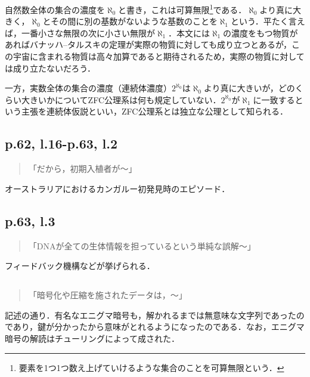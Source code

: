 \documentclass[10pt, a5paper, twoside]{jsarticle}
\theoremstyle{definition}
\begin{document}
			自然数全体の集合の濃度を$\aleph_0$と書き，これは可算無限\footnote{要素を1つ1つ数え上げていけるような集合のことを可算無限という．}である．$\aleph_0$より真に大きく，$\aleph_0$とその間に別の基数がないような基数のことを$\aleph_1$という．平たく言えば，一番小さな無限の次に小さい無限が$\aleph_1$．本文には$\aleph_1$の濃度をもつ物質があればバナッハ--タルスキの定理が実際の物質に対しても成り立つとあるが，この宇宙に含まれる物質は高々加算であると期待されるため，実際の物質に対しては成り立たないだろう．

			一方，実数全体の集合の濃度（連続体濃度）$2^{\aleph_0}$は$\aleph_0$より真に大きいが，どのくらい大きいかについてZFC公理系は何も規定していない．$2^{\aleph_0}$が$\aleph_1$に一致するという主張を連続体仮説といい，ZFC公理系とは独立な公理として知られる．

		\subsection{p.62, l.16-p.63, l.2}

			\begin{quote}

				「だから，初期入植者が〜」
				
			\end{quote}

			オーストラリアにおけるカンガルー初発見時のエピソード．

		\subsection{p.63, l.3}

			\begin{quote}

				「DNAが全ての生体情報を担っているという単純な誤解〜」
				
			\end{quote}

			フィードバック機構などが挙げられる．

		\subsection{}

			\begin{quote}
				
				「暗号化や圧縮を施されたデータは，〜」

			\end{quote}

			記述の通り．有名なエニグマ暗号も，解かれるまでは無意味な文字列であったのであり，鍵が分かったから意味がとれるようになったのである．なお，エニグマ暗号の解読はチューリングによって成された．
\end{document}
